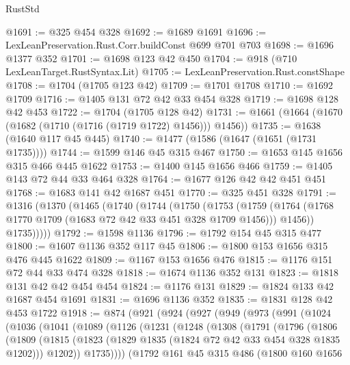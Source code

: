 \begin{lexlean}{RustStd}
\begin{coremodule}
@1691 := @325 @454 @328
@1692 := @1689 @1691
@1696 := LexLeanPreservation.Rust.Corr.buildConst @699 @701 @703
@1698 := @1696 @1377 @352
@1701 := @1698 @123 @42 @450
@1704 := @918 (@710 LexLeanTarget.RustSyntax.Lit)
@1705 := LexLeanPreservation.Rust.constShape
@1708 := @1704 (@1705 @123 @42)
@1709 := @1701 @1708
@1710 := @1692 @1709
@1716 := @1405 @131 @72 @42 @33 @454 @328
@1719 := @1698 @128 @42 @453
@1722 := @1704 (@1705 @128 @42)
@1731 := @1661 (@1664 (@1670 (@1682 (@1710 (@1716 (@1719 @1722) @1456))) @1456))
@1735 := @1638 (@1640 @117 @45 @445)
@1740 := @1477 (@1586 (@1647 (@1651 (@1731 @1735))))
@1744 := @1599 @146 @45 @315 @467
@1750 := @1653 @145 @1656 @315 @466 @445 @1622
@1753 := @1400 @145 @1656 @466
@1759 := @1405 @143 @72 @44 @33 @464 @328
@1764 := @1677 @126 @42 @42 @451 @451
@1768 := @1683 @141 @42 @1687 @451
@1770 := @325 @451 @328
@1791 := @1316
    (@1370
      (@1465
        (@1740
          (@1744
            (@1750
              (@1753
                (@1759 (@1764 (@1768 @1770 @1709 (@1683 @72 @42 @33 @451 @328 @1709 @1456))) @1456))
              @1735)))))
@1792 := @1598 @1136
@1796 := @1792 @154 @45 @315 @477
@1800 := @1607 @1136 @352 @117 @45
@1806 := @1800 @153 @1656 @315 @476 @445 @1622
@1809 := @1167 @153 @1656 @476
@1815 := @1176 @151 @72 @44 @33 @474 @328
@1818 := @1674 @1136 @352 @131
@1823 := @1818 @131 @42 @42 @454 @454
@1824 := @1176 @131
@1829 := @1824 @133 @42 @1687 @454 @1691
@1831 := @1696 @1136 @352
@1835 := @1831 @128 @42 @453 @1722
@1918 := @874
    (@921
      (@924
        (@927
          (@949
            (@973
              (@991
                (@1024
                  (@1036
                    (@1041
                      (@1089
                        (@1126
                          (@1231
                            (@1248
                              (@1308
                                (@1791
                                  (@1796
                                    (@1806
                                      (@1809
                                        (@1815
                                          (@1823
                                            (@1829 @1835 (@1824 @72 @42 @33 @454 @328 @1835 @1202)))
                                          @1202))
                                      @1735))))
                              (@1792
                                @161
                                @45
                                @315
                                @486
                                (@1800
                                  @160
                                  @1656

\end{coremodule}
\end{lexlean}
